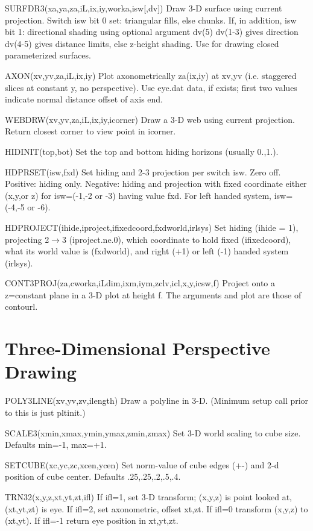 \documentclass[12pt]{article}
\begin{document}
SURFDR3(xa,ya,za,iL,ix,iy,worka,isw[,dv]) Draw 3-D surface using current
projection. Switch isw bit 0 set: triangular fills, else chunks.  If,
in addition, isw bit 1: directional shading using optional argument
dv(5) dv(1-3) gives direction dv(4-5) gives distance limits, else
z-height shading. Use for drawing closed parameterized surfaces.

AXON(xv,yv,za,iL,ix,iy) Plot axonometrically za(ix,iy) at xv,yv (i.e.
staggered slices at constant y, no perspective).  Use eye.dat data, if
exists; first two values indicate normal distance offset of axis end.

WEBDRW(xv,yv,za,iL,ix,iy,icorner) Draw  a 3-D web using current projection.
Return closest corner to view point in icorner.

HIDINIT(top,bot) Set the top and bottom hiding horizons (usually 0.,1.).

HDPRSET(isw,fxd) Set hiding and 2-3 projection per switch isw. Zero
off.  Positive: hiding only. Negative: hiding and projection with
fixed coordinate either (x,y,or z) for isw=(-1,-2 or -3) having value
fxd. For left handed system, isw=(-4,-5 or -6).

HDPROJECT(ihide,iproject,ifixedcoord,fxdworld,irlsys)
Set hiding (ihide = 1), projecting 2$\rightarrow$3 (iproject.ne.0), which
coordinate to hold fixed (ifixedcoord), what its world value is
(fxdworld), and right (+1) or left (-1) handed system (irlsys).

CONT3PROJ(za,cworka,iLdim,ixm,iym,zclv,icl,x,y,icsw,f) Project onto 
a z=constant plane in a 3-D plot at height f. The arguments and plot
are those of contourl.

\section{Three-Dimensional Perspective Drawing}

POLY3LINE(xv,yv,zv,ilength) Draw a polyline in 3-D. (Minimum setup
call prior to this is just pltinit.)

SCALE3(xmin,xmax,ymin,ymax,zmin,zmax) Set 3-D world scaling to cube
size. Defaults min=-1, max=+1.

SETCUBE(xc,yc,zc,xcen,ycen) Set norm-value of cube edges (+-) and 2-d 
position of cube center. Defaults .25,.25,.2,.5,.4.

TRN32(x,y,z,xt,yt,zt,ifl) If ifl=1, set 3-D transform; (x,y,z) is
point looked at, (xt,yt,zt) is eye. If ifl=2, set axonometric, offset
xt,zt.  If ifl=0 transform (x,y,z) to (xt,yt). If ifl=-1 return eye 
position in xt,yt,zt.
\end{document}
